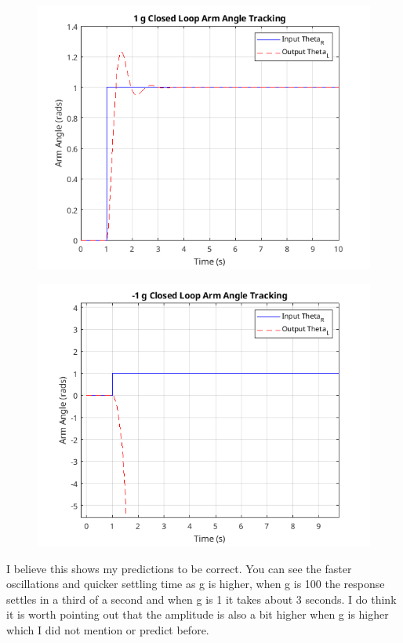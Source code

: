 \documentclass{article}
\begin{document}
\begin{figure}[H]
    \centering
    \includegraphics[width=\textwidth]{1gStep.png}
\end{figure}
\begin{figure}[H]
    \centering
    \includegraphics[width=\textwidth]{-1gStep.png}
\end{figure}

I believe this shows my predictions to be correct.
You can see the faster oscillations and quicker settling time as g is higher, when g is 100 the response settles in a third of a second and when g is 1 it takes about 3 seconds.
I do think it is worth pointing out that the amplitude is also a bit higher when g is higher which I did not mention or predict before.
\end{document}
